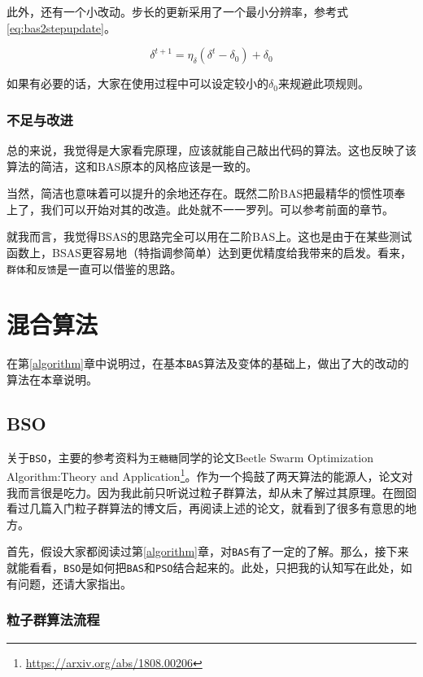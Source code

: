 \documentclass[]{ctexbook}
\renewcommand{\href}[2]{#2\footnote{\url{#1}}}
\begin{document}
此外，还有一个小改动。步长的更新采用了一个最小分辨率，参考式\eqref{eq:bas2stepupdate}。

\begin{equation}
\delta^{t+1}=\eta_{\delta}(\delta^{t}-\delta_0) + \delta_0
\label{eq:bas2stepupdate}
\end{equation}

如果有必要的话，大家在使用过程中可以设定较小的\(\delta_0\)来规避此项规则。

\subsection{不足与改进}

总的来说，我觉得是大家看完原理，应该就能自己敲出代码的算法。这也反映了该算法的简洁，这和BAS原本的风格应该是一致的。

当然，简洁也意味着可以提升的余地还存在。既然二阶BAS把最精华的惯性项奉上了，我们可以开始对其的改造。此处就不一一罗列。可以参考前面的章节。

就我而言，我觉得BSAS的思路完全可以用在二阶BAS上。这也是由于在某些测试函数上，BSAS更容易地（特指调参简单）达到更优精度给我带来的启发。看来，\texttt{群体}和\texttt{反馈}是一直可以借鉴的思路。

\chapter{混合算法}\label{mixedalgorithm}

在第\ref{algorithm}章中说明过，在基本\texttt{BAS}算法及变体的基础上，做出了大的改动的算法在本章说明。

\section{BSO}\label{bso}

关于\texttt{BSO}，主要的参考资料为\texttt{王糖糖}同学的论文\href{https://arxiv.org/abs/1808.00206}{Beetle
Swarm Optimization Algorithm:Theory and
Application}。作为一个捣鼓了两天算法的能源人，论文对我而言很是吃力。因为我此前只听说过粒子群算法，却从未了解过其原理。在囫囵看过几篇入门粒子群算法的博文后，再阅读上述的论文，就看到了很多有意思的地方。

首先，假设大家都阅读过第\ref{algorithm}章，对\texttt{BAS}有了一定的了解。那么，接下来就能看看，\texttt{BSO}是如何把\texttt{BAS}和\texttt{PSO}结合起来的。此处，只把我的认知写在此处，如有问题，还请大家指出。

\subsection{粒子群算法流程}
\end{document}
